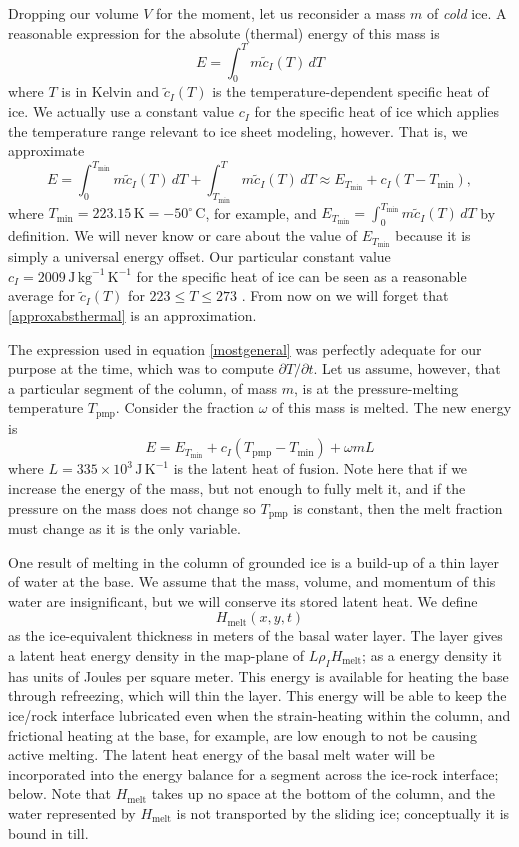 \documentclass[12pt,final]{amsart}%
\theoremstyle{plain}
\theoremstyle{definition}
\theoremstyle{remark}
\newcommand{\Tpmp}{T_{\text{pmp}}}
\begin{document}
Dropping our volume $V$ for the moment, let us reconsider a mass $m$ of \emph{cold} ice.  A reasonable expression for the absolute (thermal) energy of this mass is
    $$E = \int_{0}^T m \tilde c_I(T)\,dT$$
where $T$ is in Kelvin and $\tilde c_I(T)$ is the temperature-dependent specific heat of ice.  We actually use a constant value $c_I$ for the specific heat of ice which applies the temperature range relevant to ice sheet modeling, however.  That is, we approximate
\begin{equation}\label{approxabsthermal}
E = \int_{0}^{T_{\min}} m \tilde c_I(T)\,dT + \int_{T_{\min}}^T m \tilde c_I(T)\,dT\approx E_{T_{\min}} + c_I (T-T_{\min}),
\end{equation}
where $T_{\min} = 223.15 \,\text{K} = - {50}^\circ\, \text{C}$, for example, and $E_{T_{\min}} = \int_{0}^{T_{\min}} m \tilde c_I(T)\,dT$ by definition.  We will never know or care about the value of $E_{T_{\min}}$ because it is simply a universal energy offset.  Our particular constant value $c_I = 2009\, \text{J}\, \text{kg}^{-1}\, \text{K}^{-1}$ for the specific heat of ice can be seen as a reasonable average for $\tilde c_I(T)$ for $223 \le T \le 273$ \citep[compare][page 205]{Paterson}.  From now on we will forget that \eqref{approxabsthermal} is an approximation.

The expression used in equation \eqref{mostgeneral} was perfectly adequate for our purpose at the time, which was to compute $\partial T/\partial t$.  Let us assume, however, that a particular segment of the column, of mass $m$, is at the pressure-melting temperature $\Tpmp$.  Consider the fraction $\omega$ of this mass is melted.  The new energy is
    $$E = E_{T_{\min}} + c_I (\Tpmp-T_{\min}) + \omega m L$$
where $L = 335 \times 10^3 \,\text{J}\,\text{K}^{-1}$ is the latent heat of fusion.  Note here that if we increase the energy of the mass, but not enough to fully melt it, and if the pressure on the mass does not change so $\Tpmp$ is constant, then the melt fraction must change as it is the only variable.

One result of melting in the column of grounded ice is a build-up of a thin layer of water at the base.  We assume that the mass, volume, and momentum of this water are insignificant, but we will conserve its stored latent heat.  We define
    $$H_{\text{melt}}(x,y,t)$$
as the ice-equivalent thickness in meters of the basal water layer.  The layer gives a latent heat energy density in the map-plane of $L \rho_I H_{\text{melt}}$; as a energy density it has units of Joules per square meter.  This energy is available for heating the base through refreezing, which will thin the layer.  This energy will be able to keep the ice/rock interface lubricated even when the strain-heating within the column, and frictional heating at the base, for example, are low enough to not be causing active melting.  The latent heat energy of the basal melt water will be incorporated into the energy balance for a segment across the ice-rock interface; below.  Note that $H_{\text{melt}}$ takes up no space at the bottom of the column, and the water represented by $H_{\text{melt}}$ is not transported by the sliding ice; conceptually it is bound in till.
\end{document}
